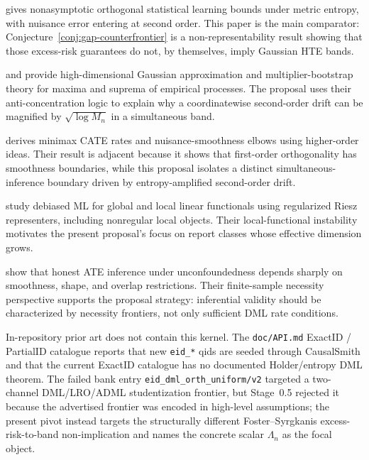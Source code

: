 \documentclass[11pt]{article}
\theoremstyle{definition}
\theoremstyle{plain}
\theoremstyle{remark}
\begin{document}
\citet{FosterSyrgkanis2023OSL} gives nonasymptotic orthogonal statistical
learning bounds under metric entropy, with nuisance error entering at second
order.  This paper is the main comparator: Conjecture~\ref{conj:gap-counterfrontier}
is a non-representability result showing that those excess-risk guarantees do
not, by themselves, imply Gaussian HTE bands.

\citet{ChernozhukovChetverikovKato2017HDCLT} and
\citet{ChernozhukovChetverikovKato2017EmpiricalBootstrap} provide
high-dimensional Gaussian approximation and multiplier-bootstrap theory for
maxima and suprema of empirical processes.  The proposal uses their
anti-concentration logic to explain why a coordinatewise second-order drift can
be magnified by \(\sqrt{\log M_n}\) in a simultaneous band.

\citet{KennedyBalakrishnanRobinsWasserman2024MinimaxCATE} derives minimax CATE
rates and nuisance-smoothness elbows using higher-order ideas.  Their result is
adjacent because it shows that first-order orthogonality has smoothness
boundaries, while this proposal isolates a distinct simultaneous-inference
boundary driven by entropy-amplified second-order drift.

\citet{ChernozhukovNeweySingh2022Riesz} study debiased ML for global and local
linear functionals using regularized Riesz representers, including nonregular
local objects.  Their local-functional instability motivates the present
proposal's focus on report classes whose effective dimension grows.

\citet{ArmstrongKolesar2021FiniteSampleATE} show that honest ATE inference
under unconfoundedness depends sharply on smoothness, shape, and overlap
restrictions.  Their finite-sample necessity perspective supports the proposal
strategy: inferential validity should be characterized by necessity frontiers,
not only sufficient DML rate conditions.

In-repository prior art does not contain this kernel.  The \texttt{doc/API.md}
ExactID / PartialID catalogue reports that new \texttt{eid\_*} qids are seeded
through CausalSmith and that the current ExactID catalogue has no documented
Holder/entropy DML theorem.  The failed bank entry
\texttt{eid\_dml\_orth\_uniform/v2} targeted a two-channel DML/LRO/ADML
studentization frontier, but Stage~0.5 rejected it because the advertised
frontier was encoded in high-level assumptions; the present pivot instead
targets the structurally different Foster--Syrgkanis excess-risk-to-band
non-implication and names the concrete scalar \(\Lambda_n\) as the focal object.
\end{document}
